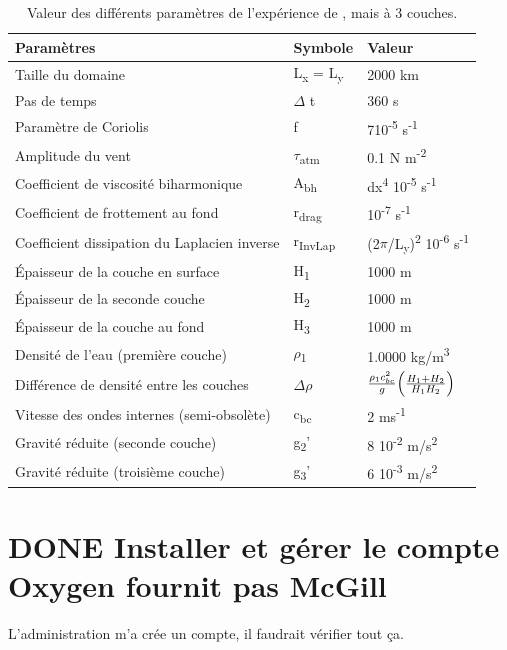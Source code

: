 \documentclass[10pt]{article}
\numberwithin{equation}{section}
\begin{document}
\begin{table}[htbp]
\caption{\label{tab:orgb788b2c}Valeur des différents paramètres de l'expérience de , mais à 3 couches.}
\centering
\begin{tabular}{lll}
\hline
\hline
Paramètres & Symbole & Valeur\\
\hline
Taille du domaine & L\textsubscript{x} = L\textsubscript{y} & 2000 km\\
Pas de temps & \(\Delta\) t & 360 s\\
Paramètre de Coriolis & f & 7\texttimes{}10\textsuperscript{-5} s\textsuperscript{-1}\\
Amplitude du vent & \(\tau\)\textsubscript{atm} & 0.1 N m\textsuperscript{-2}\\
Coefficient de viscosité biharmonique & A\textsubscript{bh} & dx\textsuperscript{4} \texttimes{}10\textsuperscript{-5} s\textsuperscript{-1}\\
Coefficient de frottement au fond & r\textsubscript{drag} & 10\textsuperscript{-7} s\textsuperscript{-1}\\
Coefficient dissipation du Laplacien inverse & r\textsubscript{InvLap} & (2\(\pi\)/L\textsubscript{y})\textsuperscript{2} \texttimes{} 10\textsuperscript{-6} s\textsuperscript{-1}\\
Épaisseur de la couche en surface & H\textsubscript{1} & 1000 m\\
Épaisseur de la seconde couche & H\textsubscript{2} & 1000 m\\
Épaisseur de la couche au fond & H\textsubscript{3} & 1000 m\\
Densité de l'eau (première couche) & \(\rho\)\textsubscript{1} & 1.0000 kg/m\textsuperscript{3}\\
Différence de densité entre les couches & \(\Delta \rho\) & \(\frac{\rho_1c_{bc}^2}{g}\qty(\frac{H_1+H_2}{H_1H_2})\)\\
Vitesse des ondes internes (semi-obsolète) & c\textsubscript{bc} & 2 ms\textsuperscript{-1}\\
Gravité réduite (seconde couche) & g\textsubscript{2}' & 8 \texttimes{} 10\textsuperscript{-2} m/s\textsuperscript{2}\\
Gravité réduite (troisième couche) & g\textsubscript{3}' & 6 \texttimes{} 10\textsuperscript{-3} m/s\textsuperscript{2}\\
\hline
\hline
\end{tabular}
\end{table}
\section{{\bfseries\sffamily DONE} Installer et gérer le compte Oxygen fournit pas McGill}
\label{sec:org239ea2b}
L'administration m'a crée un compte, il faudrait vérifier tout ça.
\end{document}
